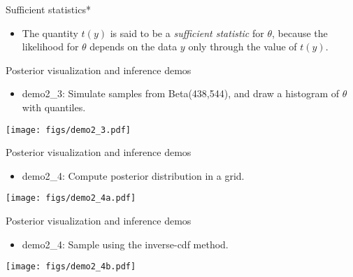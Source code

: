\documentclass[english,t]{beamer}
\begin{document}

\begin{frame}{Sufficient statistics*}

  \begin{itemize}
  \item The quantity $t(y)$ is said to be a {\em sufficient statistic}
    for $\theta$, because the likelihood for $\theta$ depends on the
    data $y$ only through the value of $t(y)$.
  \end{itemize}

\end{frame}


\begin{frame}{Posterior visualization and inference demos}

  \begin{itemize}
  \item demo2\_3: Simulate samples from Beta(438,544), and draw
    a histogram of $\theta$ with quantiles.
  \end{itemize}
  \vspace{-\baselineskip}
  \begin{center}
  \texttt{[image: figs/demo2\_3.pdf]}
\end{center}
\end{frame}

\begin{frame}{Posterior visualization and inference demos}

  \begin{itemize}
  \item demo2\_4: Compute posterior distribution in a grid.
  \end{itemize}
  \texttt{[image: figs/demo2\_4a.pdf]}
\end{frame}

\begin{frame}{Posterior visualization and inference demos}

  \begin{itemize}
  \item demo2\_4: Sample using the inverse-cdf method.
  \end{itemize}
  \texttt{[image: figs/demo2\_4b.pdf]}
\end{frame}
\end{document}
